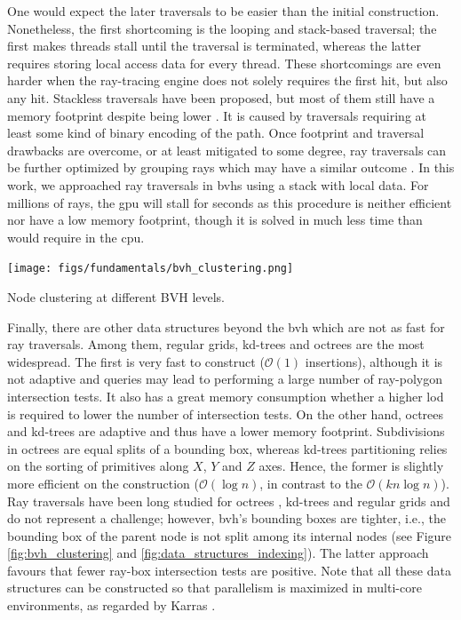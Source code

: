 One would expect the later traversals to be easier than the initial construction. Nonetheless, the first shortcoming is the looping and stack-based traversal; the first makes threads stall until the traversal is terminated, whereas the latter requires storing local access data for every thread. These shortcomings are even harder when the ray-tracing engine does not solely requires the first hit, but also any hit. Stackless traversals have been proposed, but most of them still have a memory footprint despite being lower \cite{meister_survey_2021}. It is caused by traversals requiring at least some kind of binary encoding of the path. Once footprint and traversal drawbacks are overcome, or at least mitigated to some degree, ray traversals can be further optimized by grouping rays which may have a similar outcome \cite{hendrich_ray_2019}. In this work, we approached ray traversals in \acrshort{bvh}s using a stack with local data. For millions of rays, the \acrshort{gpu} will stall for seconds as this procedure is neither efficient nor have a low memory footprint, though it is solved in much less time than would require in the \acrshort{cpu}. 

\begin{marginfigure}[0.0cm]
    \texttt{[image: figs/fundamentals/bvh\_clustering.png]}
	\caption{Node clustering at different BVH levels. }
    \label{fig:bvh_clustering}
\end{marginfigure}
Finally, there are other data structures beyond the \acrshort{bvh} which are not as fast for ray traversals. Among them, regular grids, kd-trees and octrees are the most widespread. The first is very fast to construct ($\mathcal{O}(1)$ insertions), although it is not adaptive and queries may lead to performing a large number of ray-polygon intersection tests. It also has a great memory consumption whether a higher \acrshort{lod} is required to lower the number of intersection tests. On the other hand, octrees and kd-trees are adaptive and thus have a lower memory footprint. Subdivisions in octrees are equal splits of a bounding box, whereas kd-trees partitioning relies on the sorting of primitives along $X$, $Y$ and $Z$ axes. Hence, the former is slightly more efficient on the construction ($\mathcal{O}(\log{n})$, in contrast to the $\mathcal{O}(kn \log{n})$). Ray traversals have been long studied for octrees \cite{revelles_efficient_2000}, kd-trees \cite{dos_santos_kd-tree_2009} and regular grids \cite{amanatides_fast_1987} and do not represent a challenge; however, \acrshort{bvh}'s bounding boxes are tighter, i.e., the bounding box of the parent node is not split among its internal nodes (see Figure \ref{fig:bvh_clustering} and \ref{fig:data_structures_indexing}). The latter approach favours that fewer ray-box intersection tests are positive. Note that all these data structures can be constructed so that parallelism is maximized in multi-core environments, as regarded by Karras \cite{karras_maximizing_2012}.

